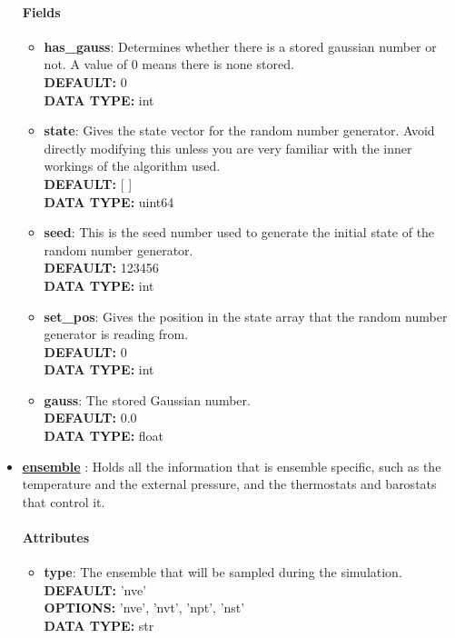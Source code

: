 \begin{itemize}
\paragraph{Fields}
 \begin{itemize}
\item {\bf has\_gauss}:
 Determines whether there is a stored gaussian number or not. A value of 0 means there is none stored.
{\\ \bf DEFAULT: }0
{\\ \bf DATA TYPE: }int
\item {\bf state}:
 Gives the state vector for the random number generator. Avoid directly modifying this unless you are very familiar with the inner workings of the algorithm used.
{\\ \bf DEFAULT: }[ ]
{\\ \bf DATA TYPE: }uint64
\item {\bf seed}:
 This is the seed number used to generate the initial state of the random number generator.
{\\ \bf DEFAULT: }123456
{\\ \bf DATA TYPE: }int
\item {\bf set\_pos}:
 Gives the position in the state array that the random number generator is reading from.
{\\ \bf DEFAULT: }0
{\\ \bf DATA TYPE: }int
\item {\bf gauss}:
 The stored Gaussian number.
{\\ \bf DEFAULT: }0.0
{\\ \bf DATA TYPE: }float
\end{itemize}
 
\item {\bf \hyperref[ENSEMBLE]{ensemble} }:
 Holds all the information that is ensemble specific, such as the temperature and the external pressure, and the thermostats and barostats that control it.
\paragraph{Attributes}
 \begin{itemize}
\item {\bf type}:
 The ensemble that will be sampled during the simulation.
{\\ \bf DEFAULT: }'nve'
{\\ \bf OPTIONS: }'nve', 'nvt', 'npt', 'nst'
{\\ \bf DATA TYPE: }str
\end{itemize}
 

\end{itemize}
